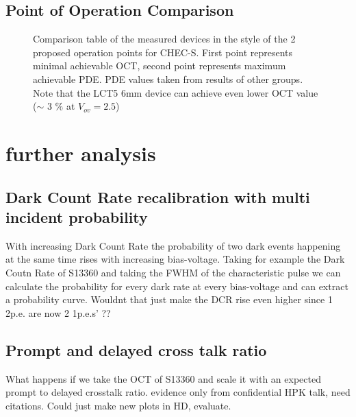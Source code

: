 \documentclass[12pt,article,type=msc,colorback,accentcolor=tud9c]{tudthesis}
\begin{document}
{\subsection{Point of Operation Comparison}
\begin{figure}[h]
\begin{centering}
\caption{Comparison table of the measured devices in the style of the 2 proposed operation points for CHEC-S. First point represents minimal achievable OCT, second point represents maximum achievable PDE. PDE values taken from results of other groups. Note that the LCT5 6mm device can achieve even lower OCT value ($\sim$ 3 $\%$ at $V_{ov}=2.5$)}
\label{fig:DC_Table}
\end{centering}
\end{figure}


\clearpage
\section{\Large further analysis}
\subsection{Dark Count Rate recalibration with multi incident probability}

With increasing Dark Count Rate the probability of two dark events happening at the same time rises with increasing bias-voltage. Taking for example the Dark Coutn Rate of S13360 and taking the FWHM of the characteristic pulse we can calculate the probability for every dark rate at every bias-voltage and can extract a probability curve. 
Wouldnt that just make the DCR rise even higher since 1 2p.e. are now 2 1p.e.s' ??




\subsection{Prompt and delayed cross talk ratio}
What happens if we take the OCT of S13360 and scale it with an expected prompt to delayed crosstalk ratio. evidence only from confidential HPK talk, need citations. Could just make new plots in HD, evaluate.

}
\end{document}
